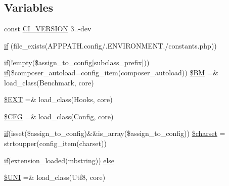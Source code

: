 \subsection*{Variables}
\begin{DoxyCompactItemize}
\item 
const \hyperlink{_code_igniter_8php_a32e3c3927ba8ec93df92327dfd85d564}{C\+I\+\_\+\+V\+E\+R\+S\+I\+O\+N} \textquotesingle{}3..-\/dev\textquotesingle{}
\item 
\hyperlink{_code_igniter_8php_a6503a8f8da73cafe64ad07639c198f54}{if} (file\+\_\+exists(A\+P\+P\+P\+A\+T\+H.\textquotesingle{}config/\textquotesingle{}.E\+N\+V\+I\+R\+O\+N\+M\+E\+N\+T.\textquotesingle{}/constants.\+php\textquotesingle{}))
\item 
\hyperlink{assets_2js_2bootstrap_8min_8js_a87cf461060832b8b68a7b48d9e371e4f}{if}(!empty(\$assign\+\_\+to\+\_\+config\mbox{[}\textquotesingle{}subclass\+\_\+prefix\textquotesingle{}\mbox{]})) \hyperlink{assets_2js_2bootstrap_8min_8js_a87cf461060832b8b68a7b48d9e371e4f}{if}(\$composer\+\_\+autoload=config\+\_\+item(\textquotesingle{}composer\+\_\+autoload\textquotesingle{})) \hyperlink{_code_igniter_8php_a3efe5c22835162259cd530154490ade3}{\$\+B\+M} =\& load\+\_\+class(\textquotesingle{}Benchmark\textquotesingle{}, \textquotesingle{}core\textquotesingle{})
\item 
\hyperlink{_code_igniter_8php_ab97aae9bc0aae04b84d360a29a3c035b}{\$\+E\+X\+T} =\& load\+\_\+class(\textquotesingle{}Hooks\textquotesingle{}, \textquotesingle{}core\textquotesingle{})
\item 
\hyperlink{_code_igniter_8php_adb9373e11e42b2cd55d1fe249ae72deb}{\$\+C\+F\+G} =\& load\+\_\+class(\textquotesingle{}Config\textquotesingle{}, \textquotesingle{}core\textquotesingle{})
\item 
\hyperlink{assets_2js_2bootstrap_8min_8js_a87cf461060832b8b68a7b48d9e371e4f}{if}(isset(\$assign\+\_\+to\+\_\+config)\&\&is\+\_\+array(\$assign\+\_\+to\+\_\+config)) \hyperlink{_code_igniter_8php_acf3a97185c56fefd63af2d2af8676bd9}{\$charset} = strtoupper(config\+\_\+item(\textquotesingle{}charset\textquotesingle{}))
\item 
\hyperlink{assets_2js_2bootstrap_8min_8js_a87cf461060832b8b68a7b48d9e371e4f}{if}(extension\+\_\+loaded(\textquotesingle{}mbstring\textquotesingle{})) \hyperlink{_code_igniter_8php_ac5109000d551293e102a2bc06f29cda4}{else}
\item 
\hyperlink{_code_igniter_8php_a2060dabd8d00b5b0539bd041bf450924}{\$\+U\+N\+I} =\& load\+\_\+class(\textquotesingle{}Utf8\textquotesingle{}, \textquotesingle{}core\textquotesingle{})

\end{DoxyCompactItemize}
